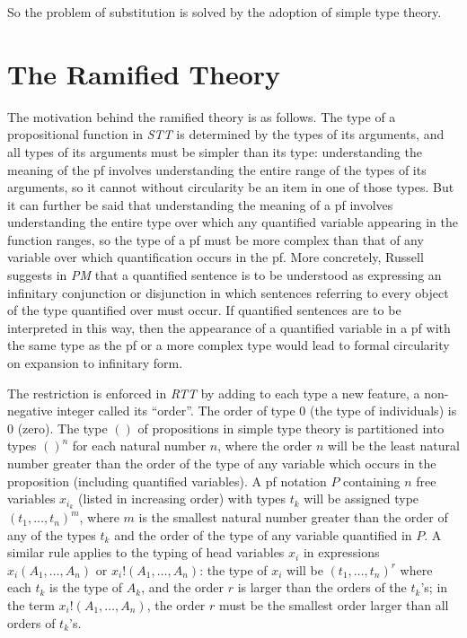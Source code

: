 \documentclass{article}
\begin{document}
So the problem of substitution is solved by the adoption of simple
type theory.

\section{The Ramified Theory}

The motivation behind the ramified theory is as follows.  The type of
a propositional function in {\em STT\/} is determined by the types of
its arguments, and all types of its arguments must be simpler than its
type: understanding the meaning of the pf involves understanding the
entire range of the types of its arguments, so it cannot without
circularity be an item in one of those types.  But it can further be
said that understanding the meaning of a pf involves understanding the
entire type over which any quantified variable appearing in the
function ranges, so the type of a pf must be more complex than that of
any variable over which quantification occurs in the pf.  More
concretely, Russell suggests in {\em PM\/} that a quantified sentence
is to be understood as expressing an infinitary conjunction or
disjunction in which sentences referring to every object of the type
quantified over must occur.  If quantified sentences are to be
interpreted in this way, then the appearance of a quantified variable
in a pf with the same type as the pf or a more complex type would lead
to formal circularity on expansion to infinitary form.

The restriction is enforced in {\em RTT\/} by adding to each type a
new feature, a non-negative integer called its ``order''.  The order
of type 0 (the type of individuals) is 0 (zero).  The type $()$ of
propositions in simple type theory is partitioned into types $()^n$
for each natural number $n$, where the order $n$ will be the least
natural number greater than the order of the type of any variable
which occurs in the proposition (including quantified variables).  A
pf notation $P$ containing $n$ free variables $x_{i_k}$ (listed in
increasing order) with types $t_k$ will be assigned type
$(t_1,\ldots,t_n)^m$, where $m$ is the smallest natural number greater
than the order of any of the types $t_k$ and the order of the type of
any variable quantified in $P$.  A similar rule applies to the typing
of head variables $x_i$ in expressions $x_i(A_1,\ldots,A_n)$ or
$x_i!(A_1,\ldots,A_n)$: the type of $x_i$ will be $(t_1,\ldots,t_n)^r$
where each $t_k$ is the type of $A_k$, and the order $r$ is larger
than the orders of the $t_k$'s; in the term $x_i!(A_1,\ldots,A_n)$,
the order $r$ must be the smallest order larger than all orders of
$t_k$'s.
\end{document}
